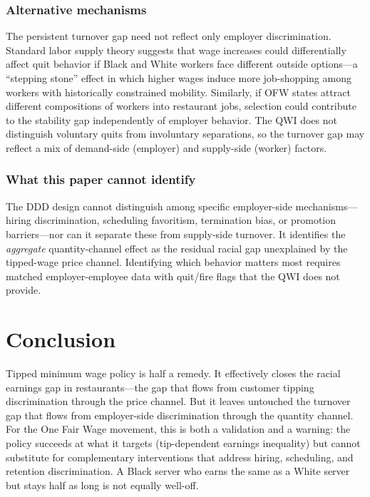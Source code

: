 \documentclass[12pt]{article}
\begin{document}
\subsubsection*{Alternative mechanisms} The persistent turnover gap need not reflect only employer discrimination. Standard labor supply theory suggests that wage increases could differentially affect quit behavior if Black and White workers face different outside options---a ``stepping stone'' effect in which higher wages induce more job-shopping among workers with historically constrained mobility. Similarly, if OFW states attract different compositions of workers into restaurant jobs, selection could contribute to the stability gap independently of employer behavior. The QWI does not distinguish voluntary quits from involuntary separations, so the turnover gap may reflect a mix of demand-side (employer) and supply-side (worker) factors.

\subsubsection*{What this paper cannot identify} The DDD design cannot distinguish among specific employer-side mechanisms---hiring discrimination, scheduling favoritism, termination bias, or promotion barriers---nor can it separate these from supply-side turnover. It identifies the \textit{aggregate} quantity-channel effect as the residual racial gap unexplained by the tipped-wage price channel. Identifying which behavior matters most requires matched employer-employee data with quit/fire flags that the QWI does not provide.

\section{Conclusion}

Tipped minimum wage policy is half a remedy. It effectively closes the racial earnings gap in restaurants---the gap that flows from customer tipping discrimination through the price channel. But it leaves untouched the turnover gap that flows from employer-side discrimination through the quantity channel. For the One Fair Wage movement, this is both a validation and a warning: the policy succeeds at what it targets (tip-dependent earnings inequality) but cannot substitute for complementary interventions that address hiring, scheduling, and retention discrimination. A Black server who earns the same as a White server but stays half as long is not equally well-off.
\end{document}
